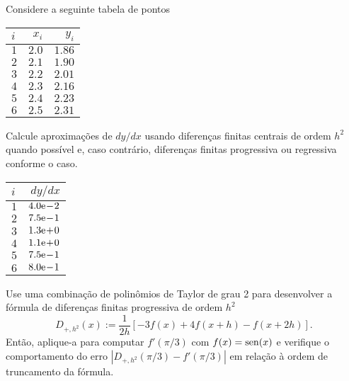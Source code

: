 \begin{exer}\label{cap_deriv_sec_df:exer:df_tab}
  Considere a seguinte tabela de pontos
  \begin{center}
    \begin{tabular}{l|rr}
      $i$ & $x_i$ & $y_i$\\\hline
      $1$ & $2.0$ & $1.86$\\
      $2$ & $2.1$ & $1.90$\\
      $3$ & $2.2$ & $2.01$\\
      $4$ & $2.3$ & $2.16$\\
      $5$ & $2.4$ & $2.23$\\
      $6$ & $2.5$ & $2.31$\\\hline
    \end{tabular}
  \end{center}
Calcule aproximações de $dy/dx$ usando diferenças finitas centrais de ordem $h^2$ quando possível e, caso contrário, diferenças finitas progressiva ou regressiva conforme o caso.
\end{exer}
\begin{resp}
  \begin{center}
    \begin{tabular}{l|r}
      $i$ & $dy/dx$\\\hline
      $1$ & $4.0\mathrm{e}\!-\!2$\\
      $2$ & $7.5\mathrm{e}\!-\!1$\\
      $3$ & $1.3\mathrm{e}\!+\!0$\\
      $4$ & $1.1\mathrm{e}\!+\!0$\\
      $5$ & $7.5\mathrm{e}\!-\!1$\\
      $6$ & $8.0\mathrm{e}\!-\!1$\\\hline
    \end{tabular}
  \end{center}
\end{resp}

\begin{exer}
  Use uma combinação de polinômios de Taylor de grau 2 para desenvolver a fórmula de diferenças finitas progressiva de ordem $h^2$
  \begin{equation}\label{cap_deriv_sec_df:eq:dfp_h2}
    D_{+,h^2}(x) := \frac{1}{2h}\left[-3f(x) + 4f(x+h) - f(x+2h)\right].
  \end{equation}
  Então, aplique-a para computar $f'(\pi/3)$ com $f(x)=\operatorname{sen}(x)$ e verifique o comportamento do erro $|D_{+,h^2}(\pi/3) - f'(\pi/3)|$ em relação à ordem de truncamento da fórmula.
\end{exer}

